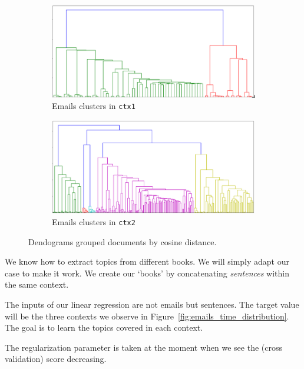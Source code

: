 \documentclass[11pt]{article}
\begin{document}
\begin{figure}[!t]
	\centering
	\begin{subfigure}[b]{0.4\linewidth}
		\centering
		\includegraphics[width=\linewidth]{images/dendogram_ctx1.png}
		\caption[]%
		{{\small Emails clusters in \texttt{ctx1}}}
		\label{fig:dendogram_ctx1}
	\end{subfigure}
	\begin{subfigure}[b]{0.4\linewidth}
		\centering
		\includegraphics[width=\linewidth]{images/dendogram_ctx2.png}
		\caption[]%
		{{\small Emails clusters in \texttt{ctx2}}}
		\label{fig:dendogram_ctx2}
	\end{subfigure}
	\caption{Dendograms grouped documents by cosine distance.}
	\label{fig:dendograms}
\end{figure}

We know how to extract topics from different books. We will simply adapt our case to make it work. We create our `books' by concatenating \emph{sentences} within the same context.

The inputs of our linear regression are not emails but sentences. The target value will be the three contexts we observe in Figure~\ref{fig:emails_time_distribution}. The goal is to learn the topics covered in each context.

The regularization parameter is taken at the moment when we see the (cross validation) score decreasing.
\end{document}
